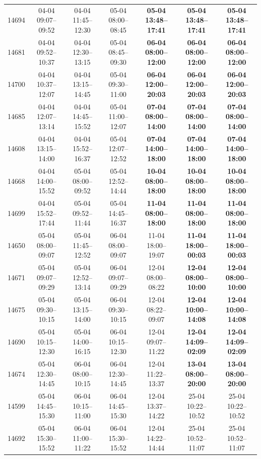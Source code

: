\begin{table}[htbp]
\begin{tabular}{|r|c|c|c|c|c|c|}
14694 & 04-04 09:07--09:52 & 04-04 11:45--12:30 & 05-04 08:00--08:45 & \textbf{05-04 13:48--17:41} & \textbf{05-04 13:48--17:41} & \textbf{05-04 13:48--17:41} \\ 
14681 & 04-04 09:52--10:37 & 04-04 12:30--13:15 & 05-04 08:45--09:30 & \textbf{06-04 08:00--12:00} & \textbf{06-04 08:00--12:00} & \textbf{06-04 08:00--12:00} \\ 
14700 & 04-04 10:37--12:07 & 04-04 13:15--14:45 & 05-04 09:30--11:00 & \textbf{06-04 12:00--20:03} & \textbf{06-04 12:00--20:03} & \textbf{06-04 12:00--20:03} \\ 
14685 & 04-04 12:07--13:14 & 04-04 14:45--15:52 & 05-04 11:00--12:07 & \textbf{07-04 08:00--14:00} & \textbf{07-04 08:00--14:00} & \textbf{07-04 08:00--14:00} \\ 
14608 & 04-04 13:15--14:00 & 04-04 15:52--16:37 & 05-04 12:07--12:52 & \textbf{07-04 14:00--18:00} & \textbf{07-04 14:00--18:00} & \textbf{07-04 14:00--18:00} \\ 
14668 & 04-04 14:00--15:52 & 05-04 08:00--09:52 & 05-04 12:52--14:44 & \textbf{10-04 08:00--18:00} & \textbf{10-04 08:00--18:00} & \textbf{10-04 08:00--18:00} \\ 
14699 & 04-04 15:52--17:44 & 05-04 09:52--11:44 & 05-04 14:45--16:37 & \textbf{11-04 08:00--18:00} & \textbf{11-04 08:00--18:00} & \textbf{11-04 08:00--18:00} \\ 
14650 & 05-04 08:00--09:07 & 05-04 11:45--12:52 & 06-04 08:00--09:07 & 11-04 18:00--19:07 & \textbf{11-04 18:00--00:03} & \textbf{11-04 18:00--00:03} \\ 
14671 & 05-04 09:07--09:29 & 05-04 12:52--13:14 & 06-04 09:07--09:29 & 12-04 08:00--08:22 & \textbf{12-04 08:00--10:00} & \textbf{12-04 08:00--10:00} \\ 
14675 & 05-04 09:30--10:15 & 05-04 13:15--14:00 & 06-04 09:30--10:15 & 12-04 08:22--09:07 & \textbf{12-04 10:00--14:08} & \textbf{12-04 10:00--14:08} \\ 
14690 & 05-04 10:15--12:30 & 05-04 14:00--16:15 & 06-04 10:15--12:30 & 12-04 09:07--11:22 & \textbf{12-04 14:09--02:09} & \textbf{12-04 14:09--02:09} \\ 
14674 & 05-04 12:30--14:45 & 06-04 08:00--10:15 & 06-04 12:30--14:45 & 12-04 11:22--13:37 & \textbf{13-04 08:00--20:00} & \textbf{13-04 08:00--20:00} \\ 
14599 & 05-04 14:45--15:30 & 06-04 10:15--11:00 & 06-04 14:45--15:30 & 12-04 13:37--14:22 & 25-04 10:22--10:52 & 25-04 10:22--10:52 \\ 
14692 & 05-04 15:30--15:52 & 06-04 11:00--11:22 & 06-04 15:30--15:52 & 12-04 14:22--14:44 & 25-04 10:52--11:07 & 25-04 10:52--11:07 \\ 

\end{tabular}
\end{table}
